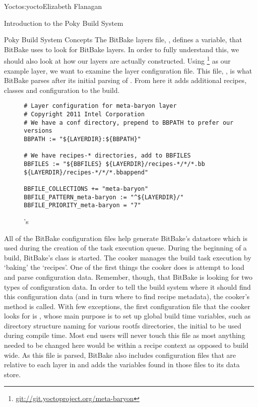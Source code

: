 \begin{aosachapter}{Yocto}{s:yocto}{Elizabeth Flanagan}
\begin{aosasect1}{Introduction to the Poky Build System}
\begin{aosasect2}{Poky Build System Concepts}
The BitBake layers file, , defines a variable,  that
BitBake uses to look for BitBake layers. In order to fully understand
this, we should also look at how our layers are actually
constructed. Using
 \footnote{\url{git://git.yoctoproject.org/meta-baryon}} as
our example layer, we want to examine the layer configuration
file. This file, , is what BitBake parses after its
initial parsing of . From here it adds additional
recipes, classes and configuration to the build.

\begin{figure}
\begin{verbatim}
# Layer configuration for meta-baryon layer
# Copyright 2011 Intel Corporation
# We have a conf directory, prepend to BBPATH to prefer our versions
BBPATH := "${LAYERDIR}:${BBPATH}"

# We have recipes-* directories, add to BBFILES
BBFILES := "${BBFILES} ${LAYERDIR}/recipes-*/*/*.bb ${LAYERDIR}/recipes-*/*/*.bbappend"

BBFILE_COLLECTIONS += "meta-baryon"
BBFILE_PATTERN_meta-baryon := "^${LAYERDIR}/"
BBFILE_PRIORITY_meta-baryon = "7"
\end{verbatim}
\caption{'s }
\label{fig.yocto.metabaryon}
\end{figure}

All of the BitBake configuration files help generate BitBake's
datastore which is used during the creation of the task execution
queue. During the beginning of a build, BitBake's  class is
started. The cooker manages the build task execution by `baking' the
`recipes'. One of the first things the cooker does is attempt to load
and parse configuration data. Remember, though, that BitBake is
looking for two types of configuration data. In order to tell the
build system where it should find this configuration data (and in turn
where to find recipe metadata), the cooker's 
method is called.  With few exceptions, the first configuration file
that the cooker looks for is , whose main purpose is to
set up global build time variables, such as directory structure naming
for various rootfs directories, the initial  to be used during
compile time. Most end users will never touch this file as most
anything needed to be changed here would be within a recipe context as
opposed to build wide. As this file is parsed, BitBake also includes
configuration files that are relative to each layer in  and
adds the variables found in those files to its data store.


\end{aosasect2}
\end{aosasect1}
\end{aosachapter}
